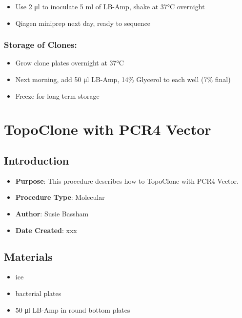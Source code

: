 \documentclass[
  letterpaper,
  DIV=11,
  numbers=noendperiod]{scrreprt}
\providecommand{\tightlist}{%
  \setlength{\itemsep}{0pt}\setlength{\parskip}{0pt}}\usepackage{longtable,booktabs,array}
\begin{document}
\begin{itemize}
\tightlist
\item
  Use 2 μl to inoculate 5 ml of LB-Amp, shake at 37°C overnight
\item
  Qiagen miniprep next day, ready to sequence
\end{itemize}

\hypertarget{storage-of-clones}{%
\subsection{Storage of Clones:}\label{storage-of-clones}}

\begin{itemize}
\tightlist
\item
  Grow clone plates overnight at 37°C
\item
  Next morning, add 50 μl LB-Amp, 14\% Glycerol to each well (7\% final)
\item
  Freeze for long term storage
\end{itemize}

\hypertarget{sec-molecular-TopoClone_PCR4}{%
\chapter{TopoClone with PCR4
Vector}\label{sec-molecular-TopoClone_PCR4}}

\hypertarget{introduction-26}{%
\section{Introduction}\label{introduction-26}}

\begin{itemize}
\item
  \textbf{Purpose}: This procedure describes how to TopoClone with PCR4
  Vector.
\item
  \textbf{Procedure Type}: Molecular
\item
  \textbf{Author}: Susie Bassham
\item
  \textbf{Date Created}: xxx
\end{itemize}

\hypertarget{materials-26}{%
\section{Materials}\label{materials-26}}

\begin{itemize}
\item
  ice
\item
  bacterial plates
\item
  50 μl LB-Amp in round bottom plates
\end{itemize}
\end{document}
